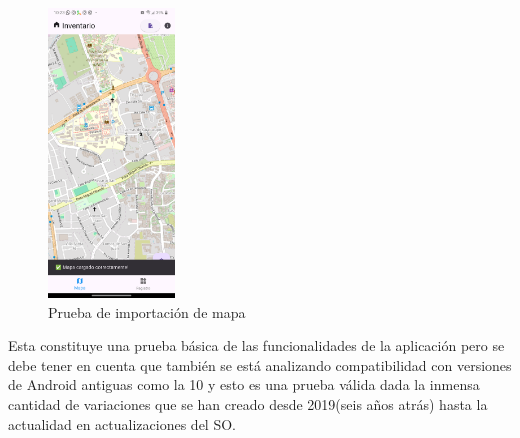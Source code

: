 \begin{figure}[h]
    \includegraphics[width=0.3\textwidth]{Graphics/Capitulo 4/LG Android 13/4.2/2.png}
    \caption{Prueba de importación de mapa}
    \label{fig:figura20}
\end{figure}
Esta constituye una prueba básica de las funcionalidades de la aplicación pero se debe tener en cuenta que también se está analizando compatibilidad
con versiones de Android antiguas como la 10 y esto es una prueba válida dada la inmensa cantidad de variaciones que se han creado desde 2019(seis años atrás)
hasta la actualidad en actualizaciones del SO.

\pagebreak

